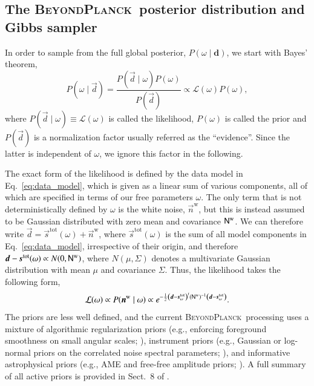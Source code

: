 \documentclass[onecolumn]{aa}
\renewcommand{\d}[0]{\vec{d}}
\newcommand{\n}[0]{\vec{n}}
\newcommand{\s}[0]{\vec{s}}
\newcommand{\N}[0]{\tens{N}}
\newcommand{\BP}{\textsc{BeyondPlanck}}
\begin{document}
\subsection{The \BP\ posterior distribution and Gibbs sampler}

In order to sample from the full global posterior, $P(\omega
\mid\mathbf{d})$, we start with Bayes' theorem,
\begin{equation}
  \label{eq:bayes}
  P(\omega\mid\d)=\frac{P(\d\mid\omega)P(\omega)}{P(\d)}
  \propto \mathcal{L}(\omega)P(\omega),
\end{equation}
where $P(\d\mid\omega)\equiv\mathcal{L}(\omega)$ is called the
likelihood, $P(\omega)$ is called the prior and $P(\d)$ is a
normalization factor usually referred as the ``evidence''. Since the
latter is independent of $\omega$, we ignore this factor in the
following.

The exact form of the likelihood is defined by the data model in
Eq.~\eqref{eq:data_model}, which is given as a linear sum of various
components, all of which are specified in terms of our free parameters
$\omega$. The only term that is not deterministically defined by
$\omega$ is the white noise, $\n^{\mathrm{w}}$, but this is instead
assumed to be Gaussian distributed with zero mean and covariance
$\N^{\mathrm{w}}$. We can therefore write
$\d=\s^{\mathrm{tot}}(\omega)+\n^\mathrm{w}$, where
$\s^{\mathrm{tot}}(\omega)$ is the sum of all model components in
Eq.~\eqref{eq:data_model}, irrespective of their origin, and therefore
$\d-\s^{\mathrm{tot}}(\omega) \propto N(0,\N^{\mathrm{w}})$, where
$N(\mu,\Sigma)$ denotes a multivariate Gaussian distribution with mean
$\mu$ and covariance $\Sigma$. Thus, the likelihood takes the
following form,
\begin{equation}
  \label{eq:bp_like}
  \mathcal{L}(\omega)\propto P(\n^\mathrm{w}\mid\omega)\propto
  e^{-\frac{1}{2}\left(\d-\s^{\mathrm{tot}}_\omega\right)^t(\N^{\mathrm{w}})^{-1}
  \left(\d-\s^{\mathrm{tot}}_\omega\right)}.
\end{equation}
The priors are less well defined, and the current \BP\ processing uses
a mixture of algorithmic regularization priors (e.g., enforcing
foreground smoothness on small angular scales; \citealp{bp13}),
instrument priors (e.g., Gaussian or log-normal priors on the
correlated noise spectral parameters; \citealp{bp06}), and informative
astrophysical priors (e.g., AME and free-free amplitude priors;
\citealp{bp13,bp11}). A full summary of all active priors is provided in
Sect.~8 of \citet{bp01}.
\end{document}
